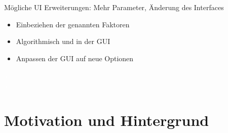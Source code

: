 \documentclass[aspectratio=169,xcolor=dvipsnames, t]{beamer}
\begin{document}
\begin{frame}
{\begin{minipage}[t][3.8cm][b]{0.48\linewidth}
{\begin{block}{Mögliche UI Erweiterungen: Mehr Parameter, Änderung des Interfaces}
\begin{itemize}
						\item<10-> Einbeziehen der genannten Faktoren
						\item<11-> Algorithmisch und in der GUI
						\item<12-> Anpassen der GUI auf neue Optionen
					\end{itemize}
				\end{block}
			\textcolor{white}{a}\\
			\textcolor{white}{a}}
			\end{minipage}}
	\end{frame}
	
	
	\section{Motivation und Hintergrund}	
\end{document}
